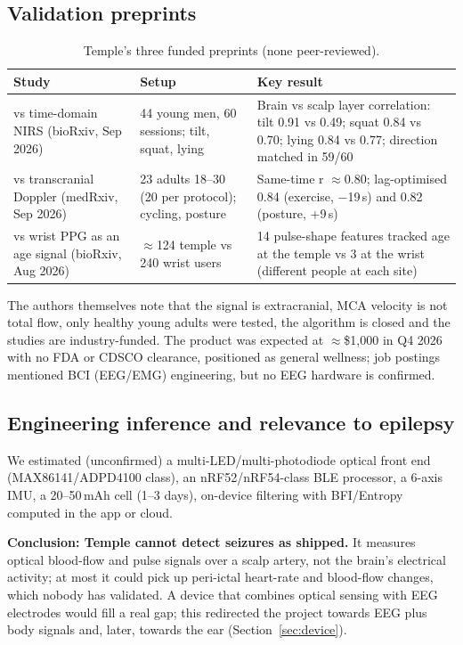 \subsection{Validation preprints}

\begin{table}[H]
\centering\small
\caption{Temple's three funded preprints (none peer-reviewed).}
\begin{tabularx}{\linewidth}{@{}L L L@{}}
\toprule
Study & Setup & Key result \\
\midrule
vs time-domain NIRS (bioRxiv, Sep 2026) & 44 young men, 60 sessions; tilt, squat, lying & Brain vs scalp layer correlation: tilt 0.91 vs 0.49; squat 0.84 vs 0.70; lying 0.84 vs 0.77; direction matched in 59/60 \\
vs transcranial Doppler (medRxiv, Sep 2026) & 23 adults 18--30 (20 per protocol); cycling, posture & Same-time r $\approx$0.80; lag-optimised 0.84 (exercise, $-$19\,s) and 0.82 (posture, +9\,s) \\
vs wrist PPG as an age signal (bioRxiv, Aug 2026) & $\approx$124 temple vs 240 wrist users & 14 pulse-shape features tracked age at the temple vs 3 at the wrist (different people at each site) \\
\bottomrule
\end{tabularx}
\end{table}

The authors themselves note that the signal is extracranial, MCA velocity is not total flow, only healthy young adults were tested, the algorithm is closed and the studies are industry-funded. The product was expected at $\approx$\$1,000 in Q4 2026 with no FDA or CDSCO clearance, positioned as general wellness; job postings mentioned BCI (EEG/EMG) engineering, but no EEG hardware is confirmed.

\subsection{Engineering inference and relevance to epilepsy}

We estimated (unconfirmed) a multi-LED/multi-photodiode optical front end (MAX86141/ADPD4100 class), an nRF52/nRF54-class BLE processor, a 6-axis IMU, a 20--50\,mAh cell (1--3 days), on-device filtering with BFI/Entropy computed in the app or cloud.

\textbf{Conclusion: Temple cannot detect seizures as shipped.} It measures optical blood-flow and pulse signals over a scalp artery, not the brain's electrical activity; at most it could pick up peri-ictal heart-rate and blood-flow changes, which nobody has validated. A device that combines optical sensing with EEG electrodes would fill a real gap; this redirected the project towards EEG plus body signals and, later, towards the ear (Section~\ref{sec:device}).
